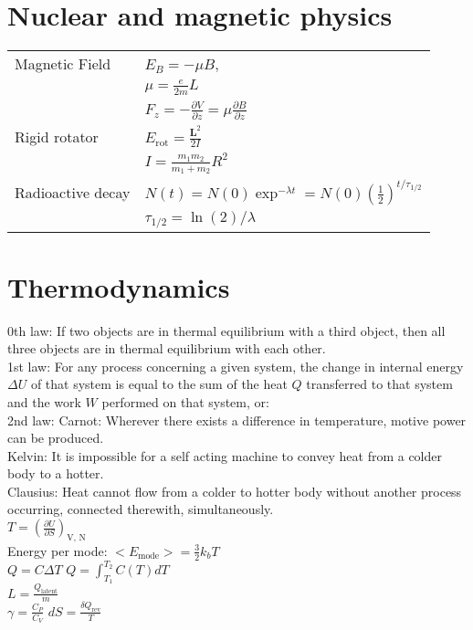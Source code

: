 \documentclass[12pt,a4paper]{article}
\begin{document}
	
	\section*{Nuclear and magnetic physics}
	\begin{tabular}{ll}
		{Magnetic Field} & \(E_B = - \mu B \), \\
		& \( \mu = \frac{e}{2m} L\)\\
		& \( F_z = - \frac{\partial V}{\partial z} = \mu \frac{\partial B}{\partial z}  \)\\
		{Rigid rotator} & \(E_\text{rot} = \frac{\textbf{L}^2}{2I}\) \\
		& \( I = \frac{m_1 m_2 }{m_1 + m_2} R^2 \) \\
		{Radioactive decay} & \( N(t) = N(0) \exp ^ {-\lambda t} = N(0) (\frac{1}{2})^{t/\tau _{1/2}}\)\\
		& \( \tau _{1/2} = \ln (2) / \lambda\)\\
	\end{tabular}
	
	\section*{Thermodynamics}
	0th law: If two objects are in thermal equilibrium with a third object, then all three objects are in thermal equilibrium with each other.\\
	1st law: For any process concerning a given system, the change in internal energy $\Delta U$ of that system is equal to the sum of the heat $Q$ transferred to that system and the work $W$ performed on that system, or:\\
	2nd law: Carnot: Wherever there exists a difference in temperature, motive power can be produced.\\
	Kelvin: It is impossible for a self acting machine to convey heat from a colder body to a hotter.\\
	Clausius: Heat cannot flow from a colder to hotter body without another process occurring, connected therewith, simultaneously.\\
	$T = (\frac{\partial U}{\partial S})_\text{V, N}$\\
	
	Energy per mode: $<E_\text{mode}> = \frac{3}{2} k_b T$\\
	$Q = C \Delta T$ $Q=\int_{T_1}^{T_2}C(T) dT$\\
	$L =\frac{Q_\text{latent}}{m}$\\
	$\gamma = \frac{C_P}{C_V}$
	$d S = \frac{\delta Q_\text{rev}}{T}$\\	
	
\end{document}
